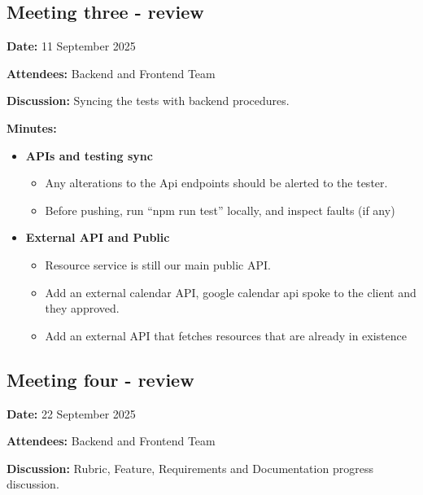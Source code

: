\subsection{Meeting three - review}

\textbf{Date:} 11 September 2025 \par
\textbf{Attendees:} Backend and Frontend Team  \par
\textbf{Discussion:} Syncing the tests with backend procedures. \par

\textbf{Minutes:}
\begin{itemize}
    \item \textbf{APIs and testing sync}
    \begin{itemize}
        \item Any alterations to the Api endpoints should be alerted to the tester.
        \item Before pushing, run “npm run test” locally, and inspect faults (if any)
    \end{itemize}

    \item \textbf{External API and Public}
    \begin{itemize}
        \item Resource service is still our main public API.
        \item Add an external calendar API, google calendar api spoke to the client and they approved.
        \item Add an external API that fetches resources that are already in existence
    \end{itemize}

\end{itemize}


\subsection{Meeting four - review}
\textbf{Date:} 22 September 2025 \par
\textbf{Attendees:} Backend and Frontend Team  \par
\textbf{Discussion:} Rubric, Feature, Requirements and Documentation progress discussion. \par

